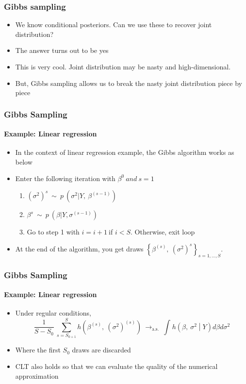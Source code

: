 \documentclass[
  shownotes,
  xcolor={svgnames},
  hyperref={colorlinks,citecolor=DarkBlue,linkcolor=DarkRed,urlcolor=DarkBlue}
  , aspectratio=169]{beamer}
\begin{document}
\begin{frame}[fragile]
\frametitle{Gibbs sampling} 


\begin{itemize}
\item We know conditional posteriors. Can we use these to recover joint distribution?
\medskip
\pause
\item The answer turns out to be yes
\medskip
\item This is very cool. Joint distribution may be nasty and high-dimensional.
\medskip
\item But, Gibbs sampling allows us to break the nasty joint distribution piece by piece

\end{itemize}
 \end{frame}
\begin{frame}[fragile]
\frametitle{Gibbs Sampling} 
\framesubtitle{Example: Linear regression}


\begin{itemize}

\item In the context of linear regression example, the Gibbs algorithm works as below
\medskip
\item Enter the following iteration with $\beta^{0}\ and\ s = 1$
\medskip
\begin{enumerate}
   \item $\left( \sigma^{2} \right)^{s}\ \sim\ p\ (\sigma^{2}|Y,\ \beta^{\left( s - 1 \right)})$
    \medskip

    \item $\beta^{s}\ \sim\ p\ (\beta|Y, \sigma^{(s - 1)} )$
    \medskip
    \item Go to step 1 with $i = i + 1\ $if $i < S$. Otherwise, exit loop
    \end{enumerate}
    \medskip
\item At the end of the algorithm, you get draws $\left\{ \beta^{(s)},\ \left( \sigma^{2} \right)^{s} \right\}_{s = 1,\ldots,S}$.

\end{itemize}

 \end{frame}
\begin{frame}[fragile]
\frametitle{Gibbs Sampling} 
\framesubtitle{Example: Linear regression}

\begin{itemize}
\item Under regular conditions,
\medskip
$$ \frac{1}{S - S_{0}}\ \sum_{s = S_{0 + 1}}^{S}{h\left( \beta^{(s)},\ \left( \sigma^{2} \right)^{(s)} \right)}\  \rightarrow_{\text{a.s.}}\ \int_{}^{}{h\left( \beta,\ \sigma^{2} \middle| Y \right)d\beta d\sigma^{2}}$$
\medskip

\item Where the first $S_{0}$ draws are discarded
\medskip
\item CLT also holds so that we can evaluate the quality of the numerical approximation
\end{itemize}
 \end{frame}
\end{document}
